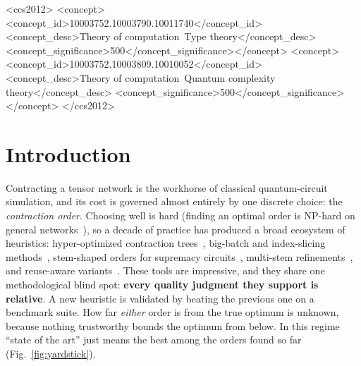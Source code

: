 \documentclass[sigplan,10pt,screen,review,anonymous]{acmart}
\begin{document}
\begin{CCSXML}
<ccs2012>
<concept><concept_id>10003752.10003790.10011740</concept_id>
<concept_desc>Theory of computation~Type theory</concept_desc>
<concept_significance>500</concept_significance></concept>
<concept><concept_id>10003752.10003809.10010052</concept_id>
<concept_desc>Theory of computation~Quantum complexity theory</concept_desc>
<concept_significance>500</concept_significance></concept>
</ccs2012>
\end{CCSXML}

\maketitle

\section{Introduction}\label{sec:intro}

Contracting a tensor network is the workhorse of classical quantum-circuit simulation, and
its cost is governed almost entirely by one discrete choice: the \emph{contraction order}.
Choosing well is hard (finding an optimal order is NP-hard on general
networks~\cite{markov2008simulating}), so a decade of practice has produced a broad
ecosystem of heuristics: hyper-optimized contraction trees~\cite{gray2021hyper},
big-batch and index-slicing methods~\cite{pan2022solving}, stem-shaped orders for supremacy
circuits~\cite{huang2020classical}, multi-stem refinements~\cite{swtnc2025}, and
reuse-aware variants~\cite{kalachev2021recursive}. These tools are impressive, and they
share one methodological blind spot: \textbf{every quality judgment they support is
relative}. A new heuristic is validated by beating the previous one on a benchmark suite.
How far \emph{either} order is from the true optimum is unknown, because nothing trustworthy
bounds the optimum from below. In this regime ``state of the art'' just means the best among
the orders found so far (Fig.~\ref{fig:yardstick}).
\end{document}
